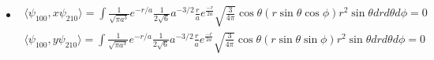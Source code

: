 \begin{itemize}
\begin{align*}
              r^2\sin\theta drd\theta d\phi \\
                      & =
              \frac{1}{8\pi a^4}\frac{32a^5}{243}24\pi \frac{4}{3} =
              \frac{128a}{243}
          \end{align*}
          \begin{align*}
              \langle
              \psi_{100}, y
              \psi_{21-1}
              \rangle & =
              \int
              \frac{1}{\sqrt{\pi a^3}}e^{-r/a}
              \frac{1}{2\sqrt{6}}a^{-3/2}\frac{r}{a}
              e^{\frac{-r}{2a}}
              \left(
              \sqrt{\frac{3}{8\pi}}\sin\theta e^{-i\phi}
              \right)(r\sin\theta\sin\phi)
              r^2\sin\theta drd\theta d\phi
              \\
                      & =
              \frac{1}{8\pi a^4}\frac{32a^5}{243}24\pi \frac{4}{3} =
              \frac{128a}{243}
          \end{align*}
          \begin{align*}
              \langle
              \psi_{100}, z
              \psi_{21-1}
              \rangle  =
              \int
              \frac{1}{\sqrt{\pi a^3}}e^{-r/a}
              \frac{1}{2\sqrt{6}}a^{-3/2}\frac{r}{a}
              e^{\frac{-r}{2a}}
              \left(
              \sqrt{\frac{3}{8\pi}}\sin\theta e^{-i\phi}
              \right)(r\cos\theta)
              r^2\sin\theta drd\theta d\phi = 0
          \end{align*}
    \item
          \begin{align*}
              \langle
              \psi_{100}, x
              \psi_{210}
              \rangle  =
              \int
              \frac{1}{\sqrt{\pi a^3}}e^{-r/a}
              \frac{1}{2\sqrt{6}}a^{-3/2}\frac{r}{a}
              e^{\frac{-r}{2a}}
              \sqrt{\frac{3}{4\pi}}\cos\theta
              (r\sin\theta\cos\phi)
              r^2\sin\theta drd\theta d\phi =
              0
          \end{align*}
          \begin{align*}
              \langle
              \psi_{100}, y
              \psi_{210}
              \rangle  =
              \int
              \frac{1}{\sqrt{\pi a^3}}e^{-r/a}
              \frac{1}{2\sqrt{6}}a^{-3/2}\frac{r}{a}
              e^{\frac{-r}{2a}}
              \sqrt{\frac{3}{4\pi}}\cos\theta
              (r\sin\theta\sin\phi)
              r^2\sin\theta drd\theta d\phi =
              0
          \end{align*}

\end{itemize}
